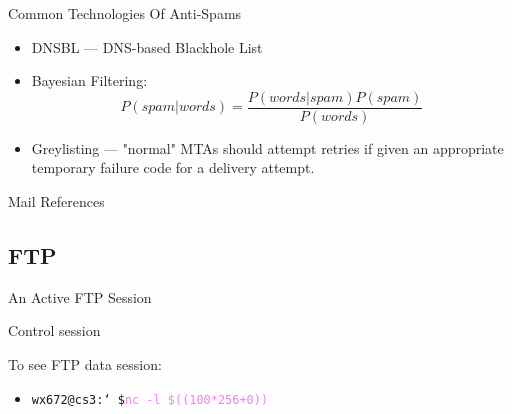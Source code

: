 
\begin{frame}{Common Technologies Of Anti-Spams}
  \begin{itemize}
  \item DNSBL --- DNS-based Blackhole List
  \item Bayesian Filtering: $$P(spam|words) = \frac{P(words|spam)P(spam)}{P(words)}$$
  \item Greylisting --- "normal" MTAs should attempt retries if given an appropriate
    temporary failure code for a delivery attempt.
  \end{itemize}
\end{frame}

\begin{frame}[allowframebreaks]{Mail References}
  \begin{refsection}
    \nocite{wiki:smtp, wiki:pop, wiki:imap, wiki:mime, rfc2821, rfc1939,
      rfc3501, rfc2045}
    \printbibliography[heading=none]
  \end{refsection}
\end{frame}

\subsection{FTP}
  
\begin{frame}{}
  \begin{center}
  \end{center} \label{fig:model}
\end{frame}

\begin{frame}{An Active FTP Session}
  \begin{iblock}{Control session}
    \begin{center}
    \end{center}
  \end{iblock}
  \begin{iblock}{To see FTP data session:}
    \begin{itemize}
    \item[] \texttt{wx672@cs3:\char`~\$}\quad\textcolor{violet}{\texttt{nc -l \$((100*256+0))}}
    \end{itemize}
  \end{iblock}
\end{frame}

